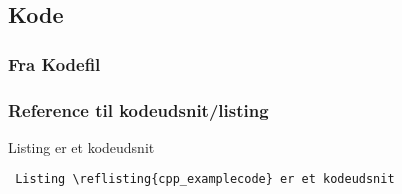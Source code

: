 \subsection{Kode}

\subsubsection{Fra Kodefil}



\subsubsection{Reference til kodeudsnit/listing}
Listing  er et kodeudsnit

\begin{verbatim} Listing \reflisting{cpp_examplecode} er et kodeudsnit \end{verbatim}